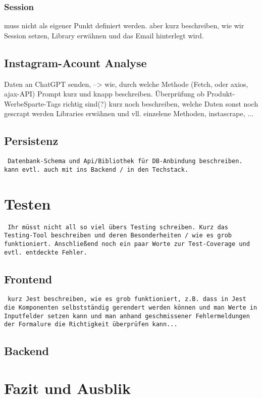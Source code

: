 \documentclass[conference,a4paper,flushend]{cs-techrep}
\begin{document}
\subsubsection{Session}
muss nicht als eigener Punkt definiert werden. aber kurz beschreiben, wie wir Session setzen, Library erwähnen und das Email hinterlegt wird.

\subsection{Instagram-Acount Analyse}
Daten an ChatGPT senden, --> wie, durch welche Methode (Fetch, oder axios, ajax-API) 
Prompt kurz und knapp beschreiben. 
Überprüfung ob Produkt-WerbeSparte-Tags richtig sind(?)
kurz noch beschreiben, welche Daten sonst noch gescrapt werden
Libraries erwähnen und vll. einzelene Methoden, instascrape, ...

\subsection{Persistenz}
\texttt{
Datenbank-Schema und Api/Bibliothek für DB-Anbindung beschreiben. kann evtl. auch mit ins Backend / in den Techstack. 
}





\section{Testen}
\texttt{
Ihr müsst nicht all so viel übers Testing schreiben. Kurz das Testing-Tool beschreiben und deren Besonderheiten / wie es grob funktioniert. Anschließend noch ein paar Worte zur Test-Coverage und evtl. entdeckte Fehler.
}
\subsection{Frontend}
\texttt{
kurz Jest beschreiben, wie es grob funktioniert, z.B. dass in Jest die Komponenten selbstständig gerendert werden können und man Werte in Inputfelder setzen kann und man anhand geschmissener Fehlermeldungen der Formalure die Richtigkeit überprüfen kann...
}
\subsection{Backend}



\section{Fazit und Ausblik}
\end{document}

